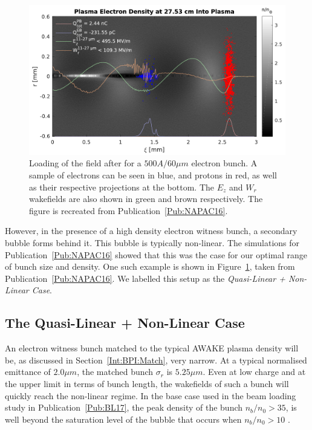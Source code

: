 \begin{figure}[hbt]
    \centering
    \includegraphics[width=0.8125\linewidth]{figures/NAPACPlasmaDensity}
    \caption{\label{Fig:SimA:NAPACPD}
        Loading of the field after for a $500\unit{A}/60\unit{\mu m}$ electron bunch.
        A sample of electrons can be seen in blue, and protons in red, as well as their respective projections at the bottom.
        The $E_z$ and $W_r$ wakefields are also shown in green and brown respectively.
        The figure is recreated from Publication~\ref{Pub:NAPAC16}.
    }
\end{figure}

However, in the presence of a high density electron witness bunch, a secondary bubble forms behind it.
This bubble is typically non-linear.
The simulations for Publication~\ref{Pub:NAPAC16} showed that this was the case for our optimal range of bunch size and density.
One such example is shown in Figure~\ref{Fig:SimA:NAPACPD}, taken from Publication~\ref{Pub:NAPAC16}.
We labelled this setup as the \textit{Quasi-Linear + Non-Linear Case}.

\subsection{The Quasi-Linear + Non-Linear Case}
\label{SimA:QLinNonLin}

An electron witness bunch matched to the typical AWAKE plasma density will be, as discussed in Section~\ref{Int:BPI:Match}, very narrow.
At a typical normalised emittance of $2.0\unit{\mu m}$, the matched bunch $\sigma_r$ is $5.25\unit{\mu m}$.
Even at low charge and at the upper limit in terms of bunch length, the wakefields of such a bunch will quickly reach the non-linear regime.
In the base case used in the beam loading study in Publication~\ref{Pub:BL17}, the peak density of the bunch $n_b/n_0 > 35$, is well beyond the saturation level of the bubble that occurs when $n_b/n_0 > 10$ \cite{lu:2005}.

